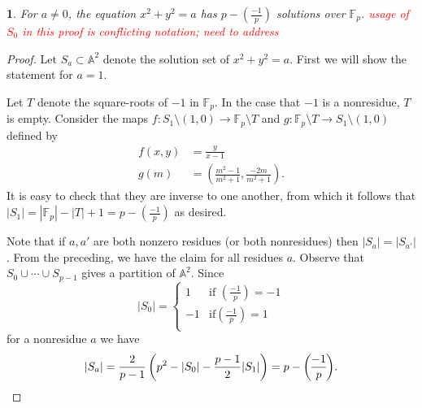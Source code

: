 \documentclass[10pt,a4paper]{amsart}
\numberwithin{equation}{section}
\numberwithin{figure}{section}
\theoremstyle{definition}
\theoremstyle{remark}
\theoremstyle{plain}
\theoremstyle{plain}
\theoremstyle{definition}
\theoremstyle{plain}
\newtheorem{prop}{\protect\propositionname}[section]
\theoremstyle{plain}
\providecommand{\propositionname}{Proposition}
\newcommand{\legendre}[2]{\genfrac{(}{)}{}{}{#1}{#2}}
\newcommand{\F}{\mathbb{F}}
\begin{document}
    \begin{prop}\label{prop:circle-solutions} 
        For $a \neq 0$, the equation $x^2 + y^2 = a$ has $p - \legendre{-1}{p}$ 
        solutions over $\F_p$.
        \textcolor{red}{usage of $S_0$ in this proof is conflicting notation; need to address} 
    \end{prop} 
    \begin{proof} 
        Let $S_a \subset \mathbb{A}^2$ denote the solution set of $x^2 + y^2 = a$. 
        First we will show the statement for $a=1$.
    	
    	Let $T$ denote the square-roots of $-1$ in $\F_p$. In the case
        that $-1$ is a nonresidue, $T$ is empty. Consider the maps $f\colon S_1
        \setminus (1,0) \to \F_p \setminus T$ and $g\colon \F_p
        \setminus T \to S_1 \setminus (1,0)$ defined by 
        \begin{align*} 
            f(x,y) &= \frac{y}{x-1} \\ 
            g(m) &= \left(\frac{m^2 - 1}{m^2 + 1}, \frac{-2m}{m^2 + 1}\right).
        \end{align*} 
        It is easy to check that they are inverse to one
        another, from which it follows that $|S_1| = |\F_p| - |T| + 1 = p -
        \legendre{-1}{p}$ as desired.
    	
    	Note that if $a,a'$ are both nonzero residues (or both nonresidues)
        then $|S_a| = |S_{a'}|$. From the preceding, we have the claim for all residues
        $a$. Observe that $S_0 \cup \cdots \cup S_{p-1}$ gives a partition of
        $\mathbb{A}^2$. Since 
        \[ |S_0| = \begin{cases}
            1 & \text{if } \legendre{-1}{p} = -1 \\
            -1 & \text{if} \legendre{-1}{p} = 1 \\
        \end{cases} \] 
        for a nonresidue $a$ we have 
        \[ |S_a| = \frac{2}{p-1} 
                    \left(p^2 - |S_0| - \frac{p-1}{2}|S_1|\right) = 
                    p - \legendre{-1}{p}. \qedhere \] 
    \end{proof}
\end{document}
